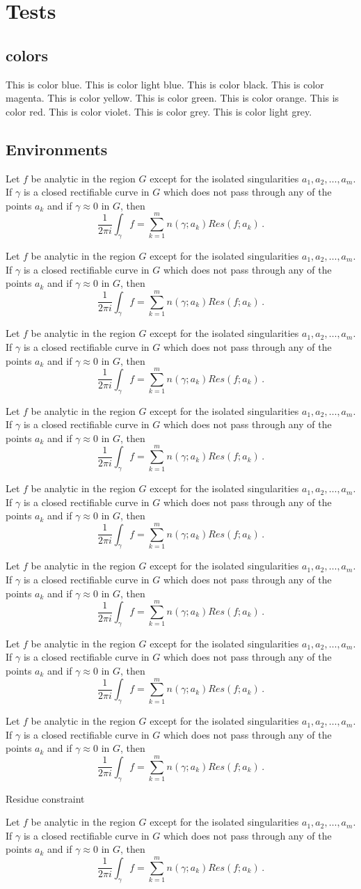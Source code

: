 \chapter{Tests}

\section{colors}
\textcolor{CSblue}{This is color blue.}
\textcolor{CSlightblue}{This is color light blue.}
\textcolor{CSblack}{This is color black.}
\textcolor{CSmagenta}{This is color magenta.}
\textcolor{CSyellow}{This is color yellow.}
\textcolor{CSgreen}{This is color green.}
\textcolor{CSorange}{This is color orange.}
\textcolor{CSred}{This is color red.}
\textcolor{CSviolet}{This is color violet.}
\textcolor{CSgrey}{This is color grey.}
\textcolor{CSlightgrey}{This is color light grey.}


\section{Environments}

\newcommand{\debugTestMath}{
Let $f$ be analytic in the region $G$ except for the isolated 
singularities $a_1,a_2,\dots,a_m$. If $\gamma$ is a closed 
rectifiable curve in $G$ which does not pass through any of the 
points $a_k$ and if $\gamma\approx 0$ in $G$, then
\[
  \frac{1}{2\pi i}\int_\gamma\! f = \sum_{k=1}^m 
  n(\gamma;a_k)Res(f;a_k)\,.
\]
}

\begin{theorem}
    \debugTestMath
\end{theorem}
\begin{lemma}
    \debugTestMath
\end{lemma}
\begin{corollary}
    \debugTestMath
\end{corollary}
\begin{proposition}
    \debugTestMath
\end{proposition}
\begin{definition}
    \debugTestMath
\end{definition}
\begin{example}
    \debugTestMath
\end{example}
\begin{remark}
    \debugTestMath
\end{remark}
\begin{problem}
    \debugTestMath
\end{problem}
\begin{constraint}{Residue constraint}
    \debugTestMath
\end{constraint}

